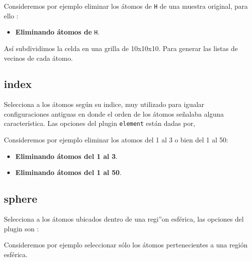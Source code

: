 Consideremos por ejemplo eliminar los \'atomos de \verb|H| de una muestra original, para ello :

\begin{itemize}
 \item \textbf{Eliminando \'atomos de} \texttt{H}.
\end{itemize}

As\'i subdividimos la celda en una grilla de 10x10x10. Para generar las listas de vecinos de cada \'atomo.

\subsection{index}
Selecciona a los \'atomos seg\'un su indice, muy utilizado para igualar configuraciones antiguas en donde el orden de los \'atomos señalaba alguna caracter\'istica. Las opciones del plugin \verb|element| est\'an dadas por,


Consideremos por ejemplo eliminar los atomos del 1 al 3 o bien del 1 al 50:

\begin{itemize}
 \item \textbf{Eliminando \'atomos del 1 al 3}.
 \item \textbf{Eliminando \'atomos del 1 al 50}.
\end{itemize}

\subsection{sphere}
Selecciona a los \'atomos ubicados dentro de una regi''on esf\'erica, las opciones del plugin son :


Consideremos por ejemplo seleccionar s\'olo los \'atomos pertenecientes a una regi\'on esf\'erica.

